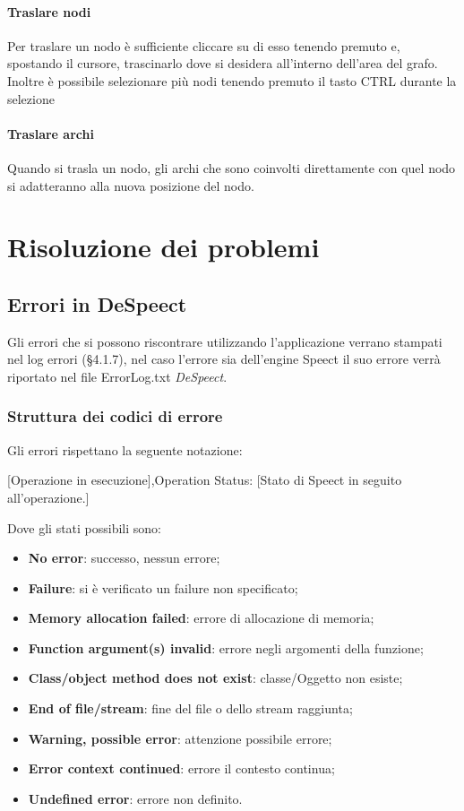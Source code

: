 \documentclass[openany,12pt,a4paper]{report}
\begin{document}
	\subsubsection{Traslare nodi}
	Per traslare un nodo è sufficiente cliccare su di esso tenendo premuto e, spostando il cursore, trascinarlo dove si desidera all'interno dell'area del grafo.
	Inoltre è possibile selezionare più nodi tenendo premuto il tasto CTRL durante la selezione
	
	\subsubsection{Traslare archi}
	Quando si trasla un nodo, gli archi che sono coinvolti direttamente con quel nodo si adatteranno alla nuova posizione del nodo.
	
	\chapter{Risoluzione dei problemi}
	
	\section{Errori in DeSpeect}
	Gli errori che si possono riscontrare utilizzando l’applicazione verrano stampati nel log errori (§4.1.7), nel caso l'errore sia dell'engine Speect il suo errore verrà riportato nel file ErrorLog.txt \textit{DeSpeect}.
	
	\subsection{Struttura dei codici di errore}
	Gli errori rispettano la seguente notazione:
	
	\begin{center}
		[Operazione in esecuzione],Operation Status: [Stato di Speect in seguito all'operazione.]
	\end{center}
	
	\noindent Dove gli stati possibili sono:
	\begin{itemize}
		\item \textbf{No error}: successo, nessun errore;
		\item \textbf{Failure}: si è verificato un failure non specificato;
		\item \textbf{Memory allocation failed}: errore di allocazione di memoria;
		\item \textbf{Function argument(s) invalid}: errore negli argomenti della funzione;
		\item \textbf{Class/object method does not exist}: classe/Oggetto non esiste;
		\item \textbf{End of file/stream}: fine del file o dello stream raggiunta;
		\item \textbf{Warning, possible error}: attenzione possibile errore;
		\item \textbf{Error context continued}: errore il contesto continua;
		\item \textbf{Undefined error}: errore non definito.
	\end{itemize}
\end{document}

